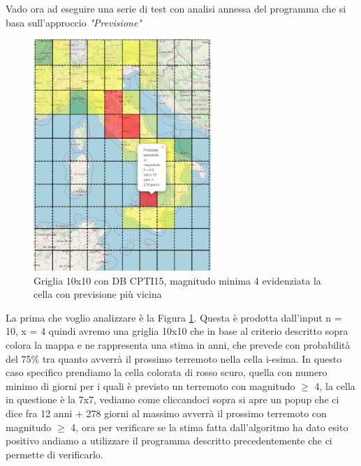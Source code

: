 Vado ora ad eseguire una serie di test con analisi annessa del programma che si basa sull'approccio \textit{"Previsione"}

\begin{figure}[H]
   \centering
   \includegraphics[width=0.600\textwidth]{images/10x10_mag4_12anniEvidenziato_CPTI15.jpg}
   \caption{Griglia 10x10 con DB CPTI15, magnitudo minima 4 evidenziata la cella con previsione pi\`u vicina}
   \label{fig:10x10_mag4_12anniEvidenziato}
\end{figure}

La prima che voglio analizzare \`e la Figura \ref{fig:10x10_mag4_12anniEvidenziato}. Questa \`e prodotta dall'input n = 10, x = 4 quindi avremo una griglia 10x10 che in base al criterio descritto sopra colora la mappa e ne rappresenta una stima in anni, che prevede con probabilit\`a del 75\% tra quanto avverr\`a il prossimo terremoto nella cella i-esima. In questo caso specifico prendiamo la cella colorata di rosso scuro, quella con numero minimo di giorni per i quali \`e previsto un terremoto con magnitudo $\ge$ 4, la cella in questione \`e la 7x7, vediamo come cliccandoci sopra si apre un popup che ci dice fra 12 anni + 278 giorni al massimo avverr\`a il prossimo terremoto con magnitudo $\ge$ 4, ora per verificare se la stima fatta dall'algoritmo ha dato esito positivo andiamo a utilizzare il programma descritto precedentemente che ci permette di verificarlo.

